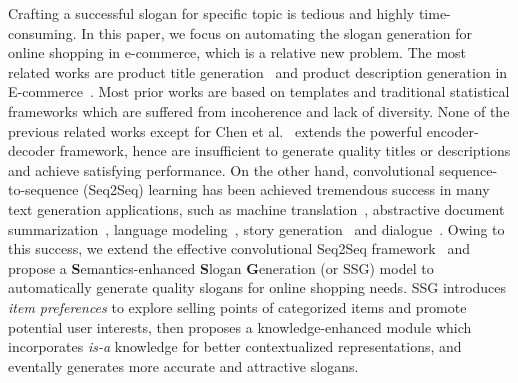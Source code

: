 Crafting a successful slogan for specific topic is tedious and highly time-consuming.
In this paper, we focus on automating the slogan generation
for online shopping in e-commerce,
which is a relative new problem. 
The most related works are product title generation~\cite{suzuki2011automatic,mathur2017generating,de2018generating}
and product description generation in E-commerce~\cite{langkilde1998generation,wang2017statistical}. Most prior works are based on templates and traditional statistical frameworks which are suffered from incoherence and lack of diversity. None of the previous related works except for Chen et al.~\cite{ChenLZYZ019} extends the powerful encoder-decoder framework, hence are
insufficient to generate quality titles or descriptions and achieve satisfying performance.
On the other hand, convolutional sequence-to-sequence (Seq2Seq) learning has been achieved tremendous success in many text generation applications, such as machine translation~\cite{wang2017statistical,chen2018stable,song2018double,wu2019pay},
abstractive document summarization~\cite{fan2017controllable,liu2018controlling,narayan2018don},
language modeling~\cite{baevski2018adaptive},
story generation~\cite{fan2018hierarchical,fan2019strategies}
and dialogue~\cite{miller2017parlai,dinan2018wizard}.
Owing to this success, 
we extend the effective convolutional Seq2Seq framework~\cite{ott2019fairseq}
and propose a 
\textbf{S}emantics-enhanced \textbf{S}logan \textbf{G}eneration (or SSG) 
model to automatically generate quality slogans for 
online shopping needs.
SSG introduces \emph{item preferences} 
to explore selling points of categorized items and promote potential user interests, then proposes a knowledge-enhanced module which
incorporates \emph{is-a} knowledge for better contextualized representations,
and eventally generates more accurate and attractive slogans.


